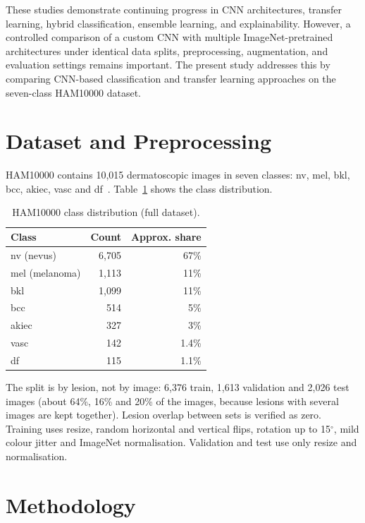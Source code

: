 \documentclass[conference]{IEEEtran}
\begin{document}
These studies demonstrate continuing progress in CNN
architectures, transfer learning, hybrid classification,
ensemble learning, and explainability. However, a controlled
comparison of a custom CNN with multiple ImageNet-pretrained
architectures under identical data splits, preprocessing,
augmentation, and evaluation settings remains important.
The present study addresses this by comparing CNN-based
classification and transfer learning approaches on the
seven-class HAM10000 dataset.
\section{Dataset and Preprocessing}
HAM10000 contains 10,015 dermatoscopic images in seven classes: nv, mel, bkl, bcc, akiec, vasc and df~\cite{tschandl2018}. Table~\ref{tab:classes} shows the class distribution.

\begin{table}[t]
\centering
\caption{HAM10000 class distribution (full dataset).}
\label{tab:classes}
\begin{tabular}{lrr}
\toprule
Class & Count & Approx. share \\
\midrule
nv (nevus)          & 6{,}705 & 67\%   \\
mel (melanoma)      & 1{,}113 & 11\%   \\
bkl                 & 1{,}099 & 11\%   \\
bcc                 &   514   & 5\%    \\
akiec               &   327   & 3\%    \\
vasc                &   142   & 1.4\%  \\
df                  &   115   & 1.1\%  \\
\bottomrule
\end{tabular}
\end{table}

The split is by lesion, not by image: 6{,}376 train, 1{,}613 validation and 2{,}026 test images (about 64\%, 16\% and 20\% of the images, because lesions with several images are kept together). Lesion overlap between sets is verified as zero. Training uses resize, random horizontal and vertical flips, rotation up to 15$^\circ$, mild colour jitter and ImageNet normalisation. Validation and test use only resize and normalisation.

\section{Methodology}
\end{document}
